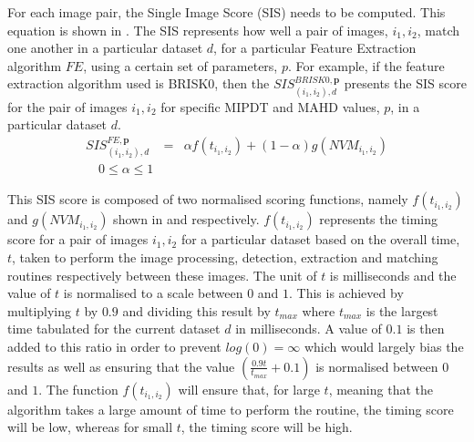 \documentclass[11pt]{report}
\begin{document}
For each image pair, the Single Image Score (SIS) needs to be computed. This equation is shown in . The SIS represents how well a pair of images, $i_1, i_2$, match one another in a particular dataset $d$, for a particular Feature Extraction algorithm $FE$, using a certain set of parameters, $p$. For example, if the feature extraction algorithm used is BRISK0, then the $SIS_{(i_1, i_2), d}^{BRISK0, \textbf{p}}$ presents the SIS score for the pair of images $i_1, i_2$ for specific MIPDT and MAHD values, $p$, in a particular dataset $d$. \\

\begin{eqnarray}
SIS_{(i_1, i_2), d}^{FE, \textbf{p}} &=& \alpha f(t_{i_1,i_2}) + (1-\alpha) g(\textit{NVM}_{i_1,i_2})\\ 
\quad 0 \leq \alpha \leq 1 
\label{eqn:optimalParameters}
\end{eqnarray}

This SIS score is composed of two normalised scoring functions, namely $f(t_{i_1, i_2})$ and $g(NVM_{i_1, i_2})$ shown in  and  respectively. $f(t_{i_1, i_2})$ represents the timing score for a pair of images $i_1, i_2$ for a particular dataset based on the overall time, $t$, taken to perform the image processing, detection, extraction and matching routines respectively between these images. The unit of $t$ is milliseconds and the value of $t$ is normalised to a scale between $0$ and $1$. This is achieved by multiplying $t$ by $0.9$ and dividing this result by $t_{max}$ where $t_{max}$ is the largest time tabulated for the current dataset $d$ in milliseconds. A value of $0.1$ is then added to this ratio in order to  prevent $log(0) = \infty$ which would largely bias the results as well as ensuring that the value $(\frac{0.9 t}{t_{max}} + 0.1)$ is normalised between $0$ and $1$. The function $f(t_{i_1, i_2})$ will ensure that, for large $t$, meaning that the algorithm takes a large amount of time to perform the routine, the timing score will be low, whereas for small $t$, the timing score will be high. \\
\end{document}

